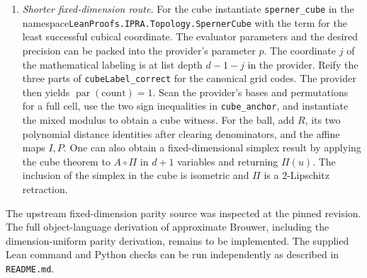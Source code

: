 \begin{enumerate}
cross-multiplying. Introduce arbitrary $s\ge m$ after building the
table and generalize it after the estimate. Close the universal formula
of Section~\ref{sec:formal} by the object rules.
\item \emph{Shorter fixed-dimension route.} For the cube instantiate
\texttt{sperner\_cube} in the namespace\linebreak[1] \texttt{LeanProofs.IPRA.Topology.SpernerCube}
with the term for the least successful cubical coordinate.
The evaluator parameters and the desired precision can be packed into
the provider's parameter $p$. The coordinate $j$ of the mathematical
labeling is at list depth $d-1-j$ in the provider. Reify the three
parts of \texttt{cubeLabel\_correct} for the canonical grid codes.
The provider then yields $\operatorname{par}(\mathrm{count})=1$.
Scan the provider's bases and permutations for a full cell, use the two
sign inequalities in \texttt{cube\_anchor}, and instantiate the mixed
modulus to obtain a cube witness. For the ball, add $R$, its two
polynomial distance identities after clearing denominators, and the affine
maps $I,P$. One can also obtain a fixed-dimensional simplex result by applying the cube theorem to $A\circ\Pi$ in $d+1$ variables and returning $\Pi(u)$. The inclusion of the simplex in the cube is isometric and $\Pi$ is a $2$-Lipschitz retraction.
\end{enumerate}

The upstream fixed-dimension parity source was inspected at the pinned
revision. The full object-language derivation of approximate Brouwer,
including the dimension-uniform parity derivation, remains to be implemented.
The supplied Lean command and Python checks can be run independently as
described in \texttt{README.md}.
